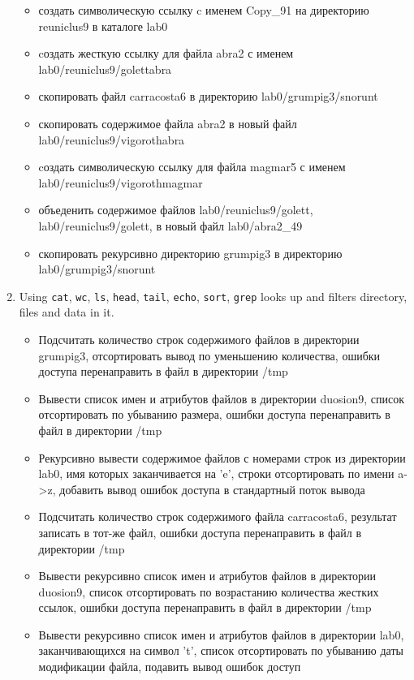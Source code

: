 \documentclass[11pt]{article}
\begin{document}
\begin{enumerate}
\begin{itemize}
		\item создать символическую ссылку c именем Copy\_91 на директорию reuniclus9 в каталоге lab0
		\item cоздать жесткую ссылку для файла abra2 с именем lab0/reuniclus9/golettabra
		\item скопировать файл carracosta6 в директорию lab0/grumpig3/snorunt
		\item скопировать содержимое файла abra2 в новый файл lab0/reuniclus9/vigorothabra
		\item cоздать символическую ссылку для файла magmar5 с именем\\ lab0/reuniclus9/vigorothmagmar
		\item объеденить содержимое файлов lab0/reuniclus9/golett, lab0/reuniclus9/golett, в новый файл lab0/abra2\_49
		\item скопировать рекурсивно директорию grumpig3 в директорию\\ lab0/grumpig3/snorunt
	\pagebreak{}
	\end{itemize}
	\item Using \texttt{cat}, \texttt{wc}, \texttt{ls}, \texttt{head}, \texttt{tail}, \texttt{echo}, \texttt{sort}, \texttt{grep} looks up and filters directory, files and data in it.
	\begin{itemize}
	\item Подсчитать количество строк содержимого файлов в директории grumpig3, отсортировать вывод по уменьшению количества, ошибки доступа перенаправить в файл в директории /tmp
	\item Вывести список имен и атрибутов файлов в директории duosion9, список отсортировать по убыванию размера, ошибки доступа перенаправить в файл в директории /tmp
	\item Рекурсивно вывести содержимое файлов с номерами строк из директории lab0, имя которых заканчивается на 'e', строки отсортировать по имени a->z, добавить вывод ошибок доступа в стандартный поток вывода
	\item Подсчитать количество строк содержимого файла carracosta6, результат записать в тот-же файл, ошибки доступа перенаправить в файл в директории /tmp
	\item Вывести рекурсивно список имен и атрибутов файлов в директории duosion9, список отсортировать по возрастанию количества жестких ссылок, ошибки доступа перенаправить в файл в директории /tmp
	\item Вывести рекурсивно список имен и атрибутов файлов в директории lab0, заканчивающихся на символ 't', список отсортировать по убыванию даты модификации файла, подавить вывод ошибок доступ

\end{itemize}
\end{enumerate}
\end{document}
